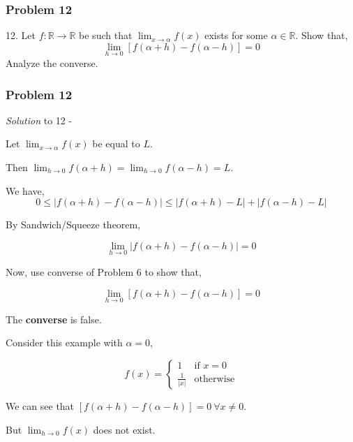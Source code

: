 \documentclass[
	11pt, %
]{beamer}
\begin{document}
\begin{frame}
	\frametitle{Problem 12}
	
	\begin{block}{12.}
		Let $f : \mathbb{R} \to \mathbb{R}$ be such that $\lim_{x \to \alpha} f(x)$ exists for some $\alpha \in \mathbb{R}$. Show that,
		\[\lim_{h \to 0} [f(\alpha+h) - f(\alpha-h)] = 0\]
		Analyze the converse.
	\end{block}
	
\end{frame}

\begin{frame}[t]
	\frametitle{Problem 12}

	\textit{Solution} to 12 -

	\bigskip

	Let $\lim_{x \to \alpha} f(x)$ be equal to $L$.
	
	\medskip 

	Then $\lim_{h \to 0} f(\alpha+h) = \lim_{h \to 0} f(\alpha-h) = L$.

	\medskip

	We have,
	\[0 \leq | f(\alpha+h) - f(\alpha-h) | \leq |f(\alpha+h) - L| + |f(\alpha-h) - L|\]

	By Sandwich/Squeeze theorem,

	\[ \lim _{h \to 0} |f(\alpha+h) - f(\alpha-h)| = 0 \]

	Now, use converse of Problem 6 to show that,

	\[ \lim _{h \to 0} [f(\alpha+h) - f(\alpha-h)] = 0 \]

\end{frame}

\begin{frame}[t]
	The \textbf{converse} is false.

	\medskip

	Consider this example with $\alpha = 0$,

	\begin{equation*}
		f(x) = 
		\begin{cases}
		   1 & \text{if $x = 0$}\\
		   \frac{1}{|x|} & \text{otherwise}
		\end{cases}
	\end{equation*}

	We can see that $[f(\alpha+h) - f(\alpha-h)] = 0 ~ \forall x \neq 0$.

	\medskip

	But $\lim_{h \to 0} f(x)$ does not exist.
\end{frame}
\end{document}

